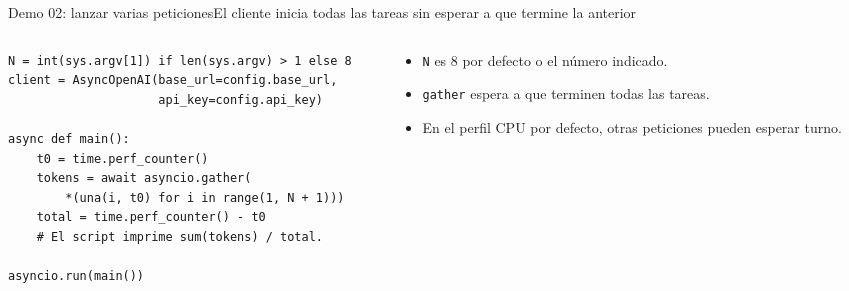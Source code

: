 \begin{frame}[fragile]{Demo 02: lanzar varias peticiones}{El cliente inicia todas las tareas sin esperar a que termine la anterior}
	\begin{columns}[T]
		\begin{column}{0.55\textwidth}
			\begin{lstlisting}
N = int(sys.argv[1]) if len(sys.argv) > 1 else 8
client = AsyncOpenAI(base_url=config.base_url,
                     api_key=config.api_key)

async def main():
    t0 = time.perf_counter()
    tokens = await asyncio.gather(
        *(una(i, t0) for i in range(1, N + 1)))
    total = time.perf_counter() - t0
    # El script imprime sum(tokens) / total.

asyncio.run(main())
\end{lstlisting}
		\end{column}
		\begin{column}{0.43\textwidth}
			\centering
			\par
			\footnotesize
			\begin{itemize}
				\item \texttt{N} es 8 por defecto o el número indicado.
				\item \texttt{gather} espera a que terminen todas las tareas.
				\item En el perfil CPU por defecto, otras peticiones pueden esperar turno.
			\end{itemize}
		\end{column}
	\end{columns}
\end{frame}

